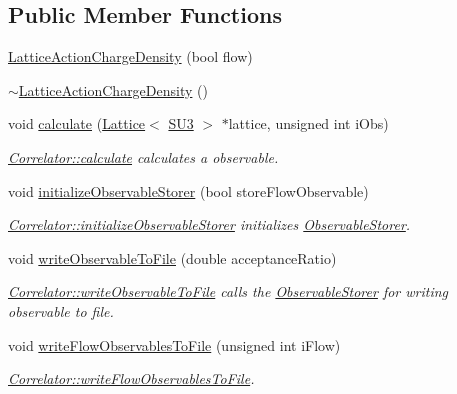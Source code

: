 \subsection*{Public Member Functions}
\begin{DoxyCompactItemize}
\item 
\mbox{\hyperlink{class_lattice_action_charge_density_acda2a43db75cca34586441d4ac7ec39e}{Lattice\+Action\+Charge\+Density}} (bool flow)
\item 
\mbox{\hyperlink{class_lattice_action_charge_density_a72679dfadb215889401f5403909b7b93}{$\sim$\+Lattice\+Action\+Charge\+Density}} ()
\item 
void \mbox{\hyperlink{class_lattice_action_charge_density_a3dddc75188042c645fbdd1c8b3e80c8a}{calculate}} (\mbox{\hyperlink{class_lattice}{Lattice}}$<$ \mbox{\hyperlink{class_s_u3}{S\+U3}} $>$ $\ast$lattice, unsigned int i\+Obs)
\begin{DoxyCompactList}\small\item\em \mbox{\hyperlink{class_correlator_ab33502ff305f891c5c2e6d66a26a0247}{Correlator\+::calculate}} calculates a observable. \end{DoxyCompactList}\item 
void \mbox{\hyperlink{class_lattice_action_charge_density_aba3131bbe5bd930adccc2852b4d44bb9}{initialize\+Observable\+Storer}} (bool store\+Flow\+Observable)
\begin{DoxyCompactList}\small\item\em \mbox{\hyperlink{class_correlator_ab99886c09dd27dfc8676d0032cecf9bc}{Correlator\+::initialize\+Observable\+Storer}} initializes \mbox{\hyperlink{class_observable_storer}{Observable\+Storer}}. \end{DoxyCompactList}\item 
void \mbox{\hyperlink{class_lattice_action_charge_density_a719f71aaccbf1b4147ea944781d69908}{write\+Observable\+To\+File}} (double acceptance\+Ratio)
\begin{DoxyCompactList}\small\item\em \mbox{\hyperlink{class_correlator_a9e8d80e30e4fbe3b7fe57521538cb5ff}{Correlator\+::write\+Observable\+To\+File}} calls the \mbox{\hyperlink{class_observable_storer}{Observable\+Storer}} for writing observable to file. \end{DoxyCompactList}\item 
void \mbox{\hyperlink{class_lattice_action_charge_density_a54226556dc1497c311e4a4d50bf44c26}{write\+Flow\+Observables\+To\+File}} (unsigned int i\+Flow)
\begin{DoxyCompactList}\small\item\em \mbox{\hyperlink{class_correlator_a168512b2ce182d9478db47f100125fa6}{Correlator\+::write\+Flow\+Observables\+To\+File}}. \end{DoxyCompactList}\item 

\end{DoxyCompactItemize}
